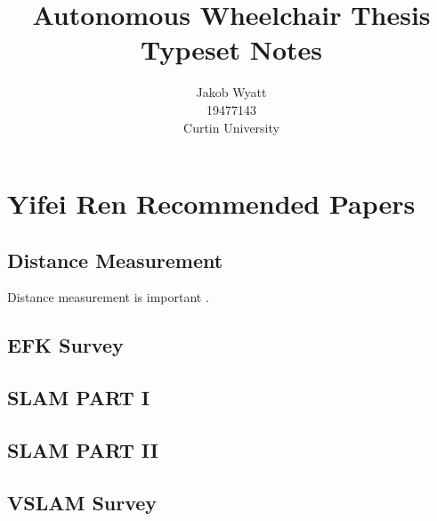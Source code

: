 \documentclass{article}
\title{Autonomous Wheelchair Thesis\\Typeset Notes}
\author{Jakob Wyatt\\19477143\\Curtin University}
\begin{document}
\maketitle
\pagebreak
\section{Yifei Ren Recommended Papers}
\subsection{Distance Measurement}
Distance measurement is important \cite{distance_measurement}.

\subsection{EFK Survey}
\subsection{SLAM PART I}
\subsection{SLAM PART II}
\subsection{VSLAM Survey}

\pagebreak
\printbibliography
\end{document}
